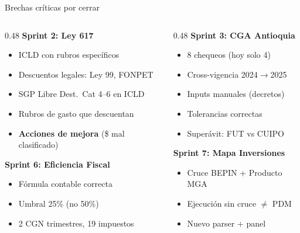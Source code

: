 \documentclass[aspectratio=169,12pt]{beamer}
\begin{document}
\begin{frame}{Brechas cr\'iticas por cerrar}
\vspace{-4pt}
\footnotesize
\begin{columns}[T]
\begin{column}{0.48\textwidth}
\textbf{\textcolor{rojo}{Sprint 2: Ley 617}}
\begin{itemize}\setlength{\itemsep}{0pt}\setlength{\parskip}{0pt}
    \item ICLD con rubros espec\'ificos
    \item Descuentos legales: Ley 99, FONPET
    \item SGP Libre Dest.~Cat 4--6 en ICLD
    \item Rubros de gasto que descuentan
    \item \textbf{Acciones de mejora} (\$ mal clasificado)
\end{itemize}

\vspace{4pt}
\textbf{\textcolor{amber}{Sprint 6: Eficiencia Fiscal}}
\begin{itemize}\setlength{\itemsep}{0pt}\setlength{\parskip}{0pt}
    \item F\'ormula contable correcta
    \item Umbral 25\% (no 50\%)
    \item 2 CGN trimestres, 19 impuestos
\end{itemize}
\end{column}

\begin{column}{0.48\textwidth}
\textbf{\textcolor{rojo}{Sprint 3: CGA Antioquia}}
\begin{itemize}\setlength{\itemsep}{0pt}\setlength{\parskip}{0pt}
    \item 8 chequeos (hoy solo 4)
    \item Cross-vigencia 2024$\to$2025
    \item Inputs manuales (decretos)
    \item Tolerancias correctas
    \item Super\'avit: FUT vs CUIPO
\end{itemize}

\vspace{4pt}
\textbf{\textcolor{amber}{Sprint 7: Mapa Inversiones}}
\begin{itemize}\setlength{\itemsep}{0pt}\setlength{\parskip}{0pt}
    \item Cruce BEPIN + Producto MGA
    \item Ejecuci\'on sin cruce $\neq$ PDM
    \item Nuevo parser + panel
\end{itemize}
\end{column}
\end{columns}
\end{frame}
\end{document}
